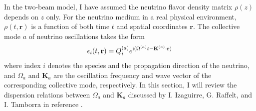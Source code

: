 In the two-beam model, I have assumed the neutrino flavor density matrix $\rho(z)$ depends on $z$ only. For the neutrino medium in a real physical environment, $\rho(t,\mathbf r)$ is a function of both time $t$ and spatial coordinates $\mathbf r$. The collective mode $a$ of neutrino oscillations takes the form
\begin{equation}
    \epsilon_i(t,\mathbf r) = Q_{i}^{(a)} e^{\ri (\Omega^{(a)} t - \mathbf K^{(a)} \cdot \mathbf r) }
    \label{chap:collective-sec:dispersion-relation-eqn:collective-mode-epsilon}
\end{equation}
where index $i$ denotes the species and the propagation direction of the neutrino, and $\Omega_a$ and $\mathbf K_a$ are the oscillation frequency and wave vector of the corresponding collective mode, respectively.  In this section, I will review the dispersion relations between $\Omega_a$ and $\mathbf K_a$ discussed by I. Izaguirre, G. Raffelt, and I. Tamborra in reference \cite{Izaguirre2016a}.

